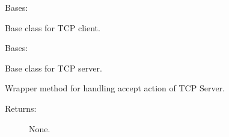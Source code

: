 \documentclass[letterpaper,10pt,english]{sphinxmanual}
\begin{document}
\begin{fulllineitems}
\label{\detokenize{QConnectBase:QConnectBase.tcp.tcp_base.TCPBaseClient}}
\sphinxAtStartPar
Bases: 

\sphinxAtStartPar
Base class for TCP client.

\begin{fulllineitems}
\label{\detokenize{QConnectBase:QConnectBase.tcp.tcp_base.TCPBaseClient.connect}}
\end{fulllineitems}


\end{fulllineitems}


\begin{fulllineitems}
\label{\detokenize{QConnectBase:QConnectBase.tcp.tcp_base.TCPBaseServer}}
\sphinxAtStartPar
Bases: 

\sphinxAtStartPar
Base class for TCP server.

\begin{fulllineitems}
\label{\detokenize{QConnectBase:QConnectBase.tcp.tcp_base.TCPBaseServer.accept_connection}}
\sphinxAtStartPar
Wrapper method for handling accept action of TCP Server.
\begin{description}
\item[{Returns:}] \leavevmode
\sphinxAtStartPar
None.

\end{description}

\end{fulllineitems}


\end{fulllineitems}
\end{document}
